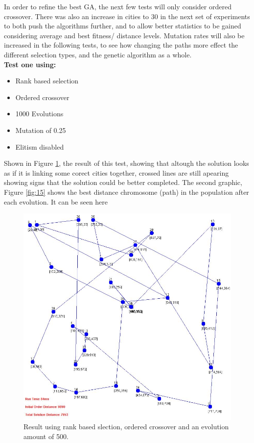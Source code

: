 \documentclass[article]{IEEEtran}
\begin{document}
In order to refine the best GA, the next few tests will only consider ordered crossover. There was also an increase in cities to 30 in the next set of experiments to both push the algorithms further, and to allow better statistics to be gained considering average and best fitness/ distance levels. Mutation rates will also be increased in the following tests, to see how changing the paths more effect the different selection types, and the genetic algorithm as a whole.\\

\textbf{Test one using:} 
\begin{itemize}
\item Rank based selection
\item Ordered crossover
\item 1000 Evolutions
\item Mutation of 0.25
\item Elitism disabled
\end{itemize} 

Shown in Figure \ref{fig:14}, the result of this test, showing that altough the solution looks as if it is linking some corect cities together, crossed lines are still apearing showing signs that the solution could be better completed. The second graphic, Figure \ref{fig:15} shows the best distance chromosome (path) in the population after each evolution. It can be seen here 

\begin{figure}[H]
\centering
  \includegraphics[width=.8\linewidth]{images/test1}
  \caption{Result using rank based slection, ordered crossover and an evolution amount of 500.}
  \label{fig:14}
\end{figure}
\end{document}
